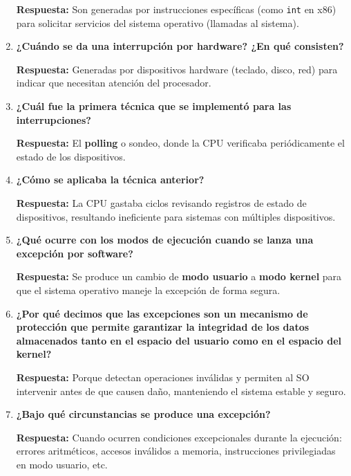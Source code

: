\documentclass[a4paper,12pt]{article}
\begin{document}
\begin{enumerate}[label=\textbf{Pregunta \arabic*.},left=0pt,itemsep=1.5em]
\textbf{Respuesta:} Son generadas por instrucciones específicas (como \texttt{int} en x86) para solicitar servicios del sistema operativo (llamadas al sistema).

\item \textbf{¿Cuándo se da una interrupción por hardware? ¿En qué consisten?}

\textbf{Respuesta:} Generadas por dispositivos hardware (teclado, disco, red) para indicar que necesitan atención del procesador.

\item \textbf{¿Cuál fue la primera técnica que se implementó para las interrupciones?}

\textbf{Respuesta:} El \textbf{polling} o sondeo, donde la CPU verificaba periódicamente el estado de los dispositivos.

\item \textbf{¿Cómo se aplicaba la técnica anterior?}

\textbf{Respuesta:} La CPU gastaba ciclos revisando registros de estado de dispositivos, resultando ineficiente para sistemas con múltiples dispositivos.

\item \textbf{¿Qué ocurre con los modos de ejecución cuando se lanza una excepción por software?}

\textbf{Respuesta:} Se produce un cambio de \textbf{modo usuario} a \textbf{modo kernel} para que el sistema operativo maneje la excepción de forma segura.

\item \textbf{¿Por qué decimos que las excepciones son un mecanismo de protección que permite garantizar la integridad de los datos almacenados tanto en el espacio del usuario como en el espacio del kernel?}

\textbf{Respuesta:} Porque detectan operaciones inválidas y permiten al SO intervenir antes de que causen daño, manteniendo el sistema estable y seguro.

\item \textbf{¿Bajo qué circunstancias se produce una excepción?}

\textbf{Respuesta:} Cuando ocurren condiciones excepcionales durante la ejecución: errores aritméticos, accesos inválidos a memoria, instrucciones privilegiadas en modo usuario, etc.

\end{enumerate}
\end{document}
